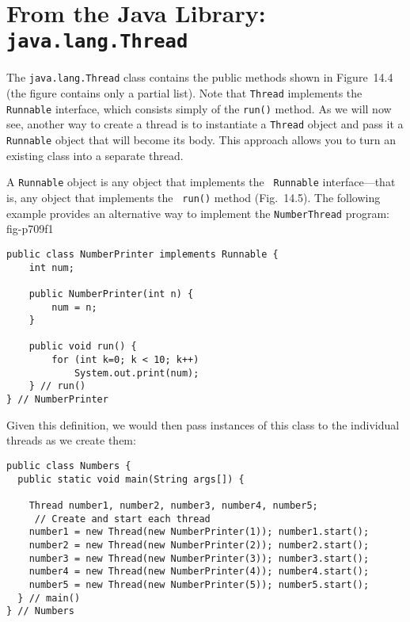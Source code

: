 
\section{From the Java Library: {\tt java.lang.Thread}}
{The} {\tt java.lang.Thread} class contains the public methods shown
in Figure~14.4 (the figure contains only a partial list).  Note that
{\tt Thread} implements the {\tt Runnable} interface, which consists
simply of the {\tt run()} method.  As we will now see, another way to
create a thread is to instantiate a {\tt Thread} object and pass it a
{\tt Runnable} object that will become its body. This approach allows
you to turn an existing class into a separate thread.

A {\tt Runnable} object is any object that implements the {\tt
Runnable} interface---that is, any object that implements the {\tt
run()} method (Fig.~14.5).  The following example provides an
alternative way to implement the {\tt NumberThread} program:
{fig-p709f1}


\begin{jjjlisting}
\begin{lstlisting}
public class NumberPrinter implements Runnable {
    int num;

    public NumberPrinter(int n) {
        num = n;
    }

    public void run() {
        for (int k=0; k < 10; k++)
            System.out.print(num);
    } // run()
} // NumberPrinter
\end{lstlisting}
\end{jjjlisting}

\noindent Given this definition, we would then pass instances of this class to
the individual threads as we create them:

\begin{jjjlisting}[29pc]
\begin{lstlisting}
public class Numbers {
  public static void main(String args[]) {

    Thread number1, number2, number3, number4, number5;
     // Create and start each thread
    number1 = new Thread(new NumberPrinter(1)); number1.start(); 
    number2 = new Thread(new NumberPrinter(2)); number2.start();
    number3 = new Thread(new NumberPrinter(3)); number3.start();
    number4 = new Thread(new NumberPrinter(4)); number4.start();
    number5 = new Thread(new NumberPrinter(5)); number5.start();
  } // main()
} // Numbers
\end{lstlisting}
\end{jjjlisting}

